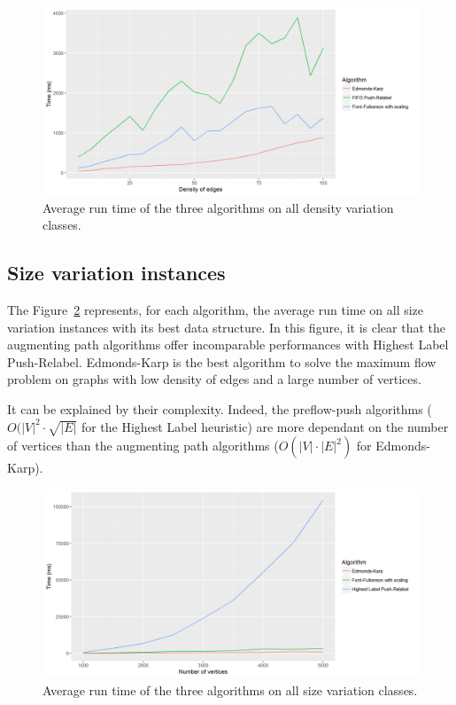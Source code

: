 \begin{figure}[H]
\begin{center}
\includegraphics[scale=0.6]{images/meandensity.png}
\caption{Average run time of the three algorithms on all density variation classes.}
\label{fig:MeanInstances}
\end{center}
\end{figure}




\subsection{Size variation instances}
The Figure~\ref{fig:MeanInstancesize} represents, for each algorithm, the average run time on all size variation instances with its best data structure. In this figure, it is clear that the augmenting path algorithms offer incomparable performances with Highest Label Push-Relabel. Edmonds-Karp is the best algorithm to solve the maximum flow problem on graphs with low density of edges and a large number of vertices.

It can be explained by their complexity. Indeed, the preflow-push algorithms ($O(|V|^2 \cdot \sqrt{|E|}$ for the Highest Label heuristic) are more dependant on the number of vertices than the augmenting path algorithms ($O(|V| \cdot |E|^2)$ for Edmonds-Karp).

\begin{figure}[H]
\begin{center}
\includegraphics[scale=0.6]{images/meansize.png}
\caption{Average run time of the three algorithms on all size variation classes.}
\label{fig:MeanInstancesize}
\end{center}
\end{figure}




